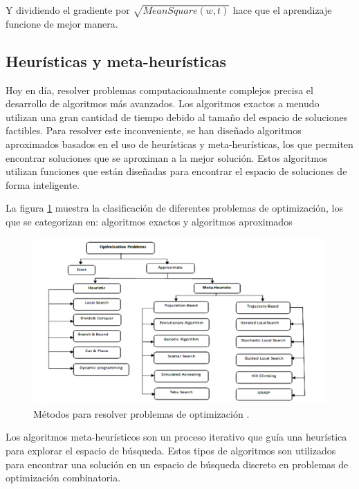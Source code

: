 Y dividiendo el gradiente por $\sqrt{MeanSquare(w, t)}$ hace que el aprendizaje funcione de mejor manera.


\subsection{Heurísticas y meta-heurísticas}
Hoy en día, resolver problemas computacionalmente complejos precisa el desarrollo de algoritmos más avanzados. Los algoritmos exactos a menudo utilizan una gran cantidad de tiempo debido al tamaño del espacio de soluciones factibles. Para resolver este inconveniente, se han diseñado algoritmos aproximados basados en el uso de heurísticas y meta-heurísticas, los que permiten encontrar soluciones que se aproximan a la mejor solución. Estos algoritmos utilizan funciones que están diseñadas para encontrar el espacio de soluciones de forma inteligente.

La figura \ref{fig:tax_opt} muestra la clasificación de diferentes problemas de optimización, los que se categorizan en: algoritmos exactos y algoritmos aproximados \cite{Desale2015}
\begin{figure}[H]
    \centering
    \includegraphics[scale=0.2]{img/tax_opt.png}
    \caption{Métodos para resolver problemas de optimización \protect\cite{Desale2015}.}
		\label{fig:tax_opt}
\end{figure}

Los algoritmos meta-heurísticos son un proceso iterativo que guía una heurística para explorar el espacio de búsqueda. Estos tipos de algoritmos son utilizados para encontrar una solución en un espacio de búsqueda discreto en problemas de optimización combinatoria.

